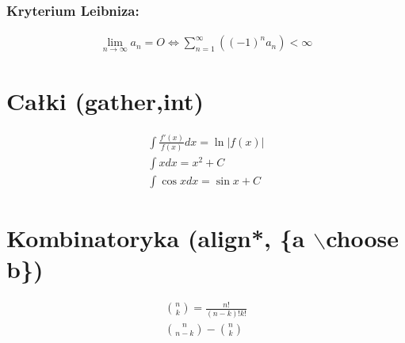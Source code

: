 \documentclass[12pt]{article}
\begin{document}
    \subsubsection{Kryterium Leibniza:} 
    
    \begin{align}
      \lim\limits_{n \rightarrow \infty} a_{n} = O \iff \sum\limits_{n=1}^{\infty} \left( \left(-1\right)^{n} a_{n}\right) < \infty
    \end{align}

\section{Całki (gather,int)}
\begin{gather} %
  \int\frac{f'(x)}{f(x)}dx = \ln\left|f(x)\right|	\\
  \int xdx = x^{2} + C \\
\int \cos xdx = \sin x + C
\end{gather}

\section{Kombinatoryka (align*, \{a $\backslash$choose b\})} 
\begin{align*} %
{n \choose k} = \frac{n!}{(n-k)!k!}\\
{n \choose n-k} - {n \choose k}
\end{align*}

\tableofcontents %
\end{document}

